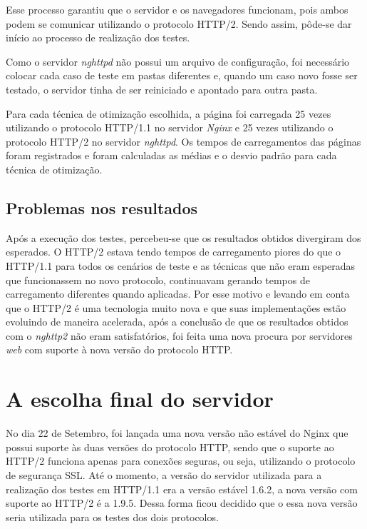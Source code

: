 Esse processo garantiu que o servidor e os navegadores funcionam, pois ambos podem se comunicar utilizando o protocolo HTTP/2. Sendo assim, pôde-se dar início ao processo de realização dos testes.

Como o servidor \textit{nghttpd} não possui um arquivo de configuração, foi necessário colocar cada caso de teste em pastas diferentes e, quando um caso novo fosse ser testado, o servidor tinha de ser reiniciado e apontado para outra pasta.

Para cada técnica de otimização escolhida, a página foi carregada 25 vezes utilizando o protocolo HTTP/1.1 no servidor \textit{Nginx} e 25 vezes utilizando o protocolo HTTP/2 no servidor \textit{nghttpd}. Os tempos de carregamentos das páginas foram registrados e foram calculadas as médias e o desvio padrão para cada técnica de otimização.

\subsection{Problemas nos resultados}
\label{problemasnosresultados}

Após a execução dos testes, percebeu-se que os resultados obtidos divergiram dos esperados. O HTTP/2 estava tendo tempos de carregamento piores do que o HTTP/1.1 para todos os cenários de teste e as técnicas que não eram esperadas que funcionassem no novo protocolo, continuavam gerando tempos de carregamento diferentes quando aplicadas. Por esse motivo e levando em conta que o HTTP/2 é uma tecnologia muito nova e que suas implementações estão evoluindo de maneira acelerada, após a conclusão de que os resultados obtidos com o \textit{nghttp2} não eram satisfatórios, foi feita uma nova procura por servidores \textit{web} com suporte à nova versão do protocolo HTTP.

\section{A escolha final do servidor}
\label{aescolhafinaldoservidor}


No dia 22 de Setembro, foi lançada uma nova versão não estável do Nginx que possui suporte às duas versões do protocolo HTTP, sendo que o suporte ao HTTP/2 funciona apenas para conexões seguras, ou seja, utilizando o protocolo de segurança SSL. Até o momento, a versão do servidor utilizada para a realização dos testes em HTTP/1.1 era a versão estável 1.6.2, a nova versão com suporte ao HTTP/2 é a 1.9.5. Dessa forma ficou decidido que o essa nova versão seria utilizada para os testes dos dois protocolos.

